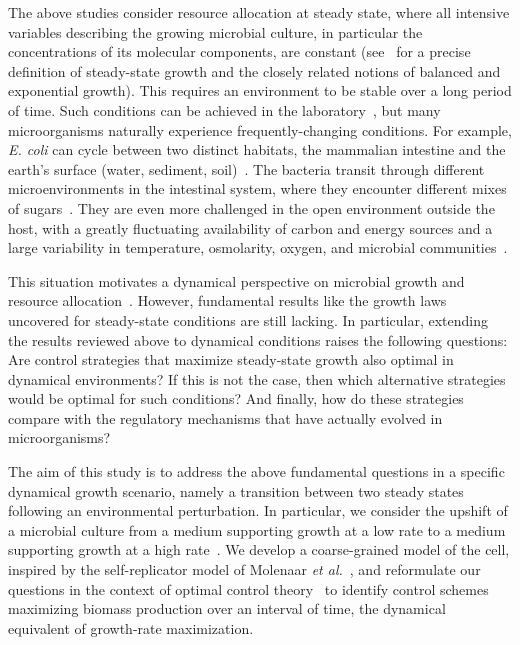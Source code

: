 The above studies consider resource allocation at steady state, where all intensive variables describing the growing microbial culture, in particular the concentrations of its molecular components, are constant (see~\cite{fishov_microbial_1995} for a precise definition of steady-state growth and the closely related notions of balanced and exponential growth).
This requires an environment to be stable over a long period of time.
Such conditions can be achieved in the laboratory~\cite{borirak_molecular_2014}, but many microorganisms naturally experience frequently-changing conditions.
For example, \textit{E. coli} can cycle between two distinct habitats, the mammalian intestine and the earth's surface (water, sediment, soil)~\cite{savageau_escherichia_1983}.
The bacteria transit through different microenvironments in the intestinal system, where they encounter different mixes of sugars~\cite{savageau_demand_1998}.
They are even more challenged in the open environment outside the host, with a greatly fluctuating availability of carbon and energy sources and a large variability in temperature, osmolarity, oxygen, and microbial communities~\cite{blount_unexhausted_2015,vanelsas_survival_2011}.

This situation motivates a dynamical perspective on microbial growth and resource allocation~\cite{pavlov_optimal_2013,vandenberg_optimal_1998,waldherr_dynamic_2015,ehrenberg_mediumdependent_2012}. However, fundamental results like the growth laws uncovered for steady-state conditions are still lacking.
In particular, extending the results reviewed above to dynamical conditions raises the following questions:
Are control strategies that maximize steady-state growth also optimal in dynamical environments?
If this is not the case, then which alternative strategies would be optimal for such conditions?
And finally, how do these strategies compare with the regulatory mechanisms that have actually evolved in microorganisms?

The aim of this study is to address the above fundamental questions in a specific dynamical growth scenario, namely a transition between two steady states following an environmental perturbation.
In particular, we consider the upshift of a microbial culture from a medium supporting growth at a low rate to a medium supporting growth at a high rate~\cite{ehrenberg_mediumdependent_2012}.
We develop a coarse-grained model of the cell, inspired by the self-replicator model of Molenaar \textit{et al.}~\cite{molenaar_shifts_2009}, and reformulate our questions in the context of optimal control theory~\cite{stengel_optimal_1994} to identify control schemes maximizing biomass production over an interval of time, the dynamical equivalent of growth-rate maximization.

